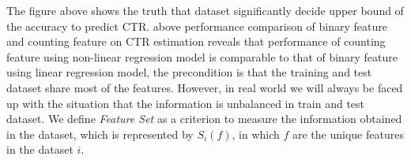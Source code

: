 \documentclass{sig-alternate}
\begin{document}
\fi

The figure above shows the truth that dataset significantly decide upper bound of the accuracy to predict CTR. above performance comparison of binary feature and counting feature on CTR estimation reveals that performance of counting feature using non-linear regression model is comparable to that of binary feature using linear regression model, the precondition is that the training and test dataset share most of the features. However, in real world we will always be faced up with the situation that the information is unbalanced in train and test dataset. We define \textit{Feature Set} as a criterion to measure the information obtained in the dataset, which is represented by  \(S_i(f)\), in which \(f\) are the unique features in the dataset \(i\).\vspace{5mm}
\end{document}
